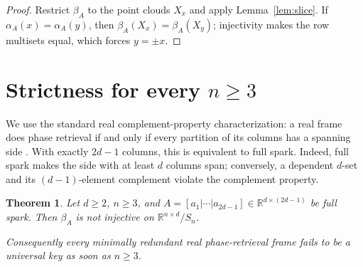 \documentclass[11pt]{article}
\newtheorem{theorem}{Theorem}
\newcommand{\R}{\mathbb R}
\newcommand{\Sn}{S_n}
\begin{document}
\begin{proof}
Restrict \(\beta_A\) to the point clouds \(X_x\) and apply
Lemma~\ref{lem:slice}.  If \(\alpha_A(x)=\alpha_A(y)\), then
\(\beta_A(X_x)=\beta_A(X_y)\); injectivity makes the row multisets equal,
which forces \(y=\pm x\).
\end{proof}

\section{Strictness for every \texorpdfstring{\(n\ge3\)}{n at least 3}}

We use the standard real complement-property characterization: a real frame
does phase retrieval if and only if every partition of its columns has a
spanning side \cite{BCE}.  With exactly \(2d-1\) columns, this is equivalent
to full spark.  Indeed, full spark makes the side with at least \(d\) columns
span; conversely, a dependent \(d\)-set and its \((d-1)\)-element complement
violate the complement property.

\begin{theorem}\label{thm:strict}
Let \(d\ge2\), \(n\ge3\), and
\(A=[a_1|\cdots|a_{2d-1}]\in\R^{d\times(2d-1)}\) be full spark.  Then
\(\beta_A\) is not injective on \(\R^{n\times d}/\Sn\).

Consequently every minimally redundant real phase-retrieval frame fails to
be a universal key as soon as \(n\ge3\).
\end{theorem}
\end{document}
